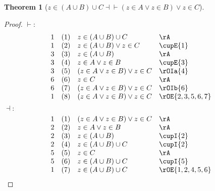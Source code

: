 \documentclass{book}
\theoremstyle{plain}
\newtheorem{theorem}{Theorem}
\theoremstyle{remark}
\theoremstyle{definition}
\begin{document}
\label{zInLpAcuBRpcuCEqvLpzInAOrzInBRpOrzInC}
\begin{theorem}[\(z \in (A \cup B)\cup C \dashv\vdash (z \in A \lor z \in B)\lor z\in C\)]
\end{theorem}	
\begin{proof}
	\(\vdash:\)
	\[
	\begin{array}{llll}
		1 & (1) & z\in (A \cup B)\cup C & \rA \\
		1 & (2) & z\in (A \cup B)\lor z\in C & \cupE{1} \\
		3 & (3) & z\in (A \cup B) & \rA \\
		3 & (4) & z\in A\lor z\in B & \cupE{3} \\
		3 & (5) & (z\in A\lor z\in B)\lor z\in C & \rOIa{4} \\
		6 & (6) & z\in C & \rA \\
		6 & (7) & (z\in A\lor z\in B)\lor z\in C & \rOIb{6}\\
		1 & (8) & (z\in A\lor z\in B)\lor z\in C & \rOE{2,3,5,6,7}\\		
	\end{array}
	\]
	\(\dashv:\)
	\[
	\begin{array}{llll}
		1 & (1) & (z\in A\lor z\in B)\lor z\in C & \rA\\			
		2 & (2) & z\in A\lor z\in B & \rA\\			
		2 & (3) & z\in (A\cup B) & \cupI{2}\\			
		2 & (4) & z\in (A\cup B)\cup C & \cupI{2}\\			
		5 & (5) & z\in C & \rA\\		
		5 & (6) & z\in (A\cup B)\cup C & \cupI{5}\\		
		1 & (7) & z\in (A\cup B)\cup C & \rOE{1,2,4,5,6}\\				
	\end{array}
	\]
\end{proof}
\end{document}
